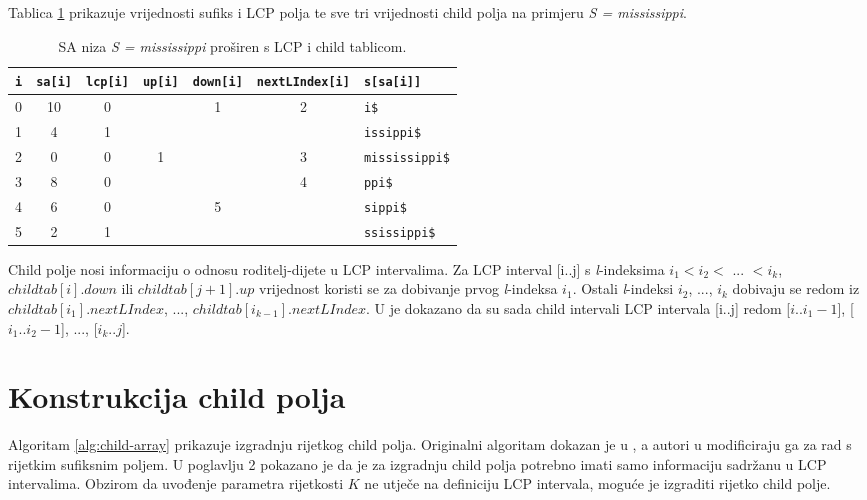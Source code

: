 \documentclass[times, utf8, seminar, numeric]{fer}
\begin{document}
Tablica \ref{tbl:example} prikazuje vrijednosti sufiks i LCP polja te sve tri vrijednosti child polja na primjeru \textit{S = mississippi}.

\begin{table}[h]
	\centering
	\caption{SA  niza \textit{S = mississippi} proširen s LCP i child tablicom.}
	\label{tbl:example}
	
	\begin{tabular}{ccccccl}
		\hline
    \texttt{i} & \texttt{sa[i]} & \texttt{lcp[i]} & \texttt{up[i]} & \texttt{down[i]} & \texttt{nextLIndex[i]} & \texttt{s[sa[i]]} \\ \hline
    0 & 10 &  0 &    &  1 &  2 & \texttt{i\$}           \\
    1 &  4 &  1 &    &    &    & \texttt{issippi\$}     \\
    2 &  0 &  0 &  1 &    &  3 & \texttt{mississippi\$} \\
    3 &  8 &  0 &    &    &  4 & \texttt{ppi\$}         \\
    4 &  6 &  0 &    &  5 &    & \texttt{sippi\$}       \\
    5 &  2 &  1 &    &    &    & \texttt{ssissippi\$}   \\ \hline
	\end{tabular}
\end{table}


Child polje nosi informaciju o odnosu roditelj-dijete u LCP intervalima. Za LCP interval [i..j] s \textit{l}-indeksima $i_1 < i _2 <$ ... $< i_k$, $childtab[i].down$ ili $childtab[j+1].up$ vrijednost koristi se za dobivanje prvog \textit{l}-indeksa $i_1$. Ostali \textit{l}-indeksi $i _2$, ..., $i_k$ dobivaju se redom iz $childtab[i_1].nextLIndex$, ..., $childtab[i_{k-1}].nextLIndex$. U \cite{esa} je dokazano da su sada child intervali LCP intervala [i..j] redom [$i..i_1-1$], [$i_1..i_2-1$], ..., [$i_k..j$].

\chapter{Konstrukcija child polja}

Algoritam \ref{alg:child-array} prikazuje izgradnju rijetkog child polja. Originalni algoritam dokazan je u \cite{esa}, a autori u \cite{essa} modificiraju ga za rad s rijetkim sufiksnim poljem. U poglavlju 2 pokazano je da je za izgradnju child polja potrebno imati samo informaciju sadržanu u LCP intervalima. Obzirom da uvođenje parametra rijetkosti $K$ ne utječe na definiciju LCP intervala, moguće je izgraditi rijetko child polje.
\end{document}
